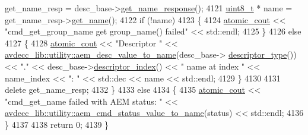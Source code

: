 \begin{DoxyCode}
      get\_name\_resp = desc\_base->\hyperlink{classavdecc__lib_1_1descriptor__base_aba4bf8a81f90f5bf00d5c8b5a7330145}{get\_name\_response}();
4121         \hyperlink{stdint_8h_aba7bc1797add20fe3efdf37ced1182c5}{uint8\_t} * name = get\_name\_resp->\hyperlink{classavdecc__lib_1_1descriptor__base__get__name__response_a8d13dc83e2fca08ad67c1218a0501081}{get\_name}();
4122         \textcolor{keywordflow}{if} (!name)
4123         \{
4124             \hyperlink{cmd__line_8h_a0bc38ccc65c79ba06c6fcd7b4bf554c3}{atomic\_cout} << \textcolor{stringliteral}{"cmd\_get\_group\_name get group\_name() failed"} << std::endl;
4125         \}
4126         \textcolor{keywordflow}{else}
4127         \{
4128             \hyperlink{cmd__line_8h_a0bc38ccc65c79ba06c6fcd7b4bf554c3}{atomic\_cout} << \textcolor{stringliteral}{"Descriptor "} << 
      \hyperlink{namespaceavdecc__lib_1_1utility_a6bdd02679e5a911a071d4aa03be341f0}{avdecc\_lib::utility::aem\_desc\_value\_to\_name}(desc\_base->
      \hyperlink{classavdecc__lib_1_1descriptor__base_a5112b70022171063ec5d3242bee9910e}{descriptor\_type}()) << \textcolor{stringliteral}{"."} << desc\_base->\hyperlink{classavdecc__lib_1_1descriptor__base_a7eed5583bffdf72d89021b188648c1b5}{descriptor\_index}() << \textcolor{stringliteral}{" name at
       index "} << name\_index << \textcolor{stringliteral}{": "} << std::dec << name << std::endl;
4129         \}
4130 
4131         \textcolor{keyword}{delete} get\_name\_resp;
4132     \}
4133     \textcolor{keywordflow}{else}
4134     \{
4135         \hyperlink{cmd__line_8h_a0bc38ccc65c79ba06c6fcd7b4bf554c3}{atomic\_cout} << \textcolor{stringliteral}{"cmd\_get\_name failed with AEM status: "} << 
      \hyperlink{namespaceavdecc__lib_1_1utility_aca66a547b66fdb27f3221ad0844d60c6}{avdecc\_lib::utility::aem\_cmd\_status\_value\_to\_name}(status) 
      << std::endl;
4136     \}
4137 
4138     \textcolor{keywordflow}{return} 0;
4139 \}
\end{DoxyCode}


